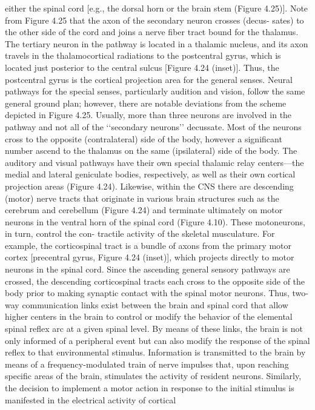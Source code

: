 either the spinal cord [e.g., the dorsal horn or the brain stem (Figure 4.25)].
Note from Figure 4.25 that the axon of the secondary neuron crosses (decus-
sates) to the other side of the cord and joins a nerve fiber tract bound for the
thalamus. The tertiary neuron in the pathway is located in a thalamic nucleus,
and its axon travels in the thalamocortical radiations to the postcentral gyrus,
which is located just posterior to the central sulcus [Figure 4.24 (inset)]. Thus,
the postcentral gyrus is the cortical projection area for the general senses.
Neural pathways for the special senses, particularly audition and vision,
follow the same general ground plan; however, there are notable deviations
from the scheme depicted in Figure 4.25. Usually, more than three neurons are
involved in the pathway and not all of the ‘‘secondary neurons’’ decussate.
Most of the neurons cross to the opposite (contralateral) side of the body,
however a significant number ascend to the thalamus on the same (ipsilateral)
side of the body. The auditory and visual pathways have their own special
thalamic relay centers—the medial and lateral geniculate bodies, respectively,
as well as their own cortical projection areas (Figure 4.24).
Likewise, within the CNS there are descending (motor) nerve tracts that
originate in various brain structures such as the cerebrum and cerebellum
(Figure 4.24) and terminate ultimately on motor neurons in the ventral horn of
the spinal cord (Figure 4.10). These motoneurons, in turn, control the con-
tractile activity of the skeletal musculature. For example, the corticospinal
tract is a bundle of axons from the primary motor cortex [precentral gyrus,
Figure 4.24 (inset)], which projects directly to motor neurons in the spinal cord.
Since the ascending general sensory pathways are crossed, the descending
corticospinal tracts each cross to the opposite side of the body prior to making
synaptic contact with the spinal motor neurons.
Thus, two-way communication links exist between the brain and spinal
cord that allow higher centers in the brain to control or modify the behavior of
the elemental spinal reflex arc at a given spinal level. By means of these links,
the brain is not only informed of a peripheral event but can also modify the
response of the spinal reflex to that environmental stimulus. Information is
transmitted to the brain by means of a frequency-modulated train of nerve
impulses that, upon reaching specific areas of the brain, stimulates the activity
of resident neurons. Similarly, the decision to implement a motor action in
response to the initial stimulus is manifested in the electrical activity of cortical

